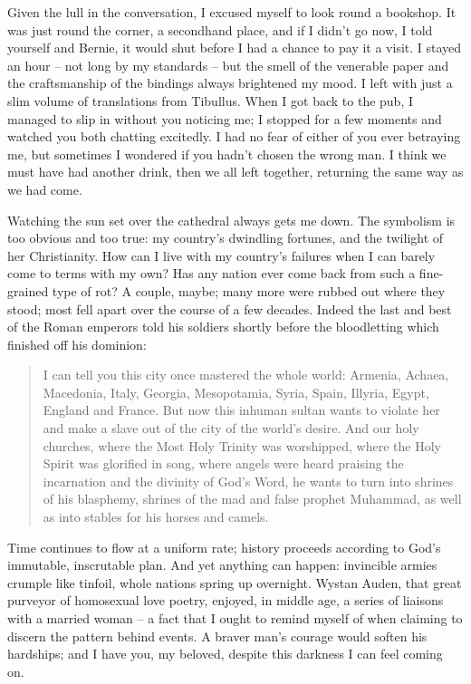 Given the lull in the conversation, I excused myself to look round a bookshop. It was just round the corner, a secondhand place, and if I didn't go now, I told yourself and Bernie, it would shut before I had a chance to pay it a visit. I stayed an hour -- not long by my standards -- but the smell of the venerable paper and the craftsmanship of the bindings always brightened my mood. I left with just a slim volume of translations from Tibullus. When I got back to the pub, I managed to slip in without you noticing me; I stopped for a few moments and watched you both chatting excitedly. I had no fear of either of you ever betraying me, but sometimes I wondered if you hadn't chosen the wrong man. I think we must have had another drink, then we all left together, returning the same way as we had come.

Watching the sun set over the cathedral always gets me down. The symbolism is too obvious and too true: my country's dwindling fortunes, and the twilight of her Christianity. How can I live with my country's failures when I can barely come to terms with my own? Has any nation ever come back from such a fine-grained type of rot? A couple, maybe; many more were rubbed out where they stood; most fell apart over the course of a few decades. Indeed the last and best of the Roman emperors told his soldiers shortly before the bloodletting which finished off his dominion:

\begin{quote}
    I can tell you this city once mastered the whole world: Armenia, Achaea, Macedonia, Italy, Georgia, Mesopotamia, Syria, Spain, Illyria, Egypt, England and France. But now this inhuman sultan wants to violate her and make a slave out of the city of the world's desire. And our holy churches, where the Most Holy Trinity was worshipped, where the Holy Spirit was glorified in song, where angels were heard praising the incarnation and the divinity of God's Word, he wants to turn into shrines of his blasphemy, shrines of the mad and false prophet Muhammad, as well as into stables for his horses and camels.
\end{quote}

Time continues to flow at a uniform rate; history proceeds according to God's immutable, inscrutable plan. And yet anything can happen: invincible armies crumple like tinfoil, whole nations spring up overnight. Wystan Auden, that great purveyor of homosexual love poetry, enjoyed, in middle age, a series of liaisons with a married woman -- a fact that I ought to remind myself of when claiming to discern the pattern behind events. A braver man's courage would soften his hardships; and I have you, my beloved, despite this darkness I can feel coming on.
